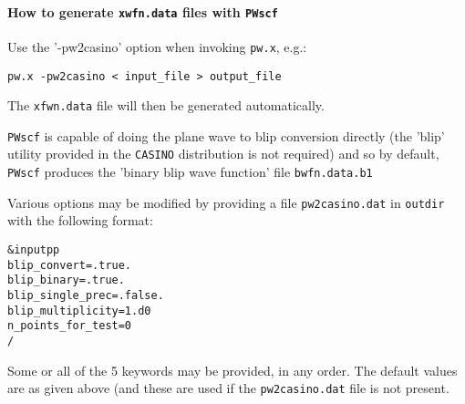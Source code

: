 \documentclass[12pt,a4paper]{article}
\def\pwx{\texttt{pw.x}}
\begin{document}
\paragraph{How to generate \texttt{xwfn.data} files with \texttt{PWscf}}
Use the '-pw2casino' option when invoking \pwx, e.g.: 
\begin{verbatim}
pw.x -pw2casino < input_file > output_file
\end{verbatim}
The \texttt{xfwn.data} file will then be generated automatically. 

\texttt{PWscf} is capable of doing the plane wave to blip conversion directly (the
'blip' utility provided in the \texttt{CASINO} distribution is not required) and so by
default, \texttt{PWscf} produces the 'binary blip wave function' file \texttt{bwfn.data.b1}

Various options may be modified by providing a file \texttt{pw2casino.dat} in \texttt{outdir}
with the following format: 
\begin{verbatim}
&inputpp
blip_convert=.true.
blip_binary=.true.
blip_single_prec=.false.
blip_multiplicity=1.d0
n_points_for_test=0
/
\end{verbatim}
Some or all of the 5 keywords may be provided, in any order. The default
values are as given above (and these are used if the \texttt{pw2casino.dat} file is
not present.
\end{document}
